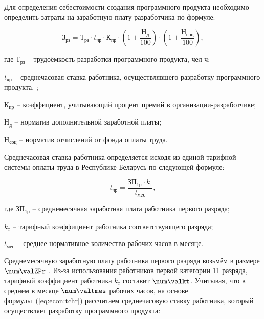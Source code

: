 Для определения себестоимости создания программного продукта необходимо определить затраты
на заработную плату разработчика по формуле:

\begin{equation}
  \label{eq:econ:Zrz}
  \text{З}_{\text{рз}} =
  \text{Т}_{\text{рз}} \cdot
  t_{\text{чр}} \cdot
  \text{К}_{\text{пр}} \cdot
  \left(\text{1} + \frac{\text{Н}_{\text{д}}}{\text{100}}\right) \cdot
  \left(\text{1} + \frac{\text{Н}_{\text{соц}}}{\text{100}}\right),
\end{equation}
\begin{explanationx}
  \item[где] $ \text{Т}_\text{рз} $ -- трудоёмкость разработки программного продукта, чел-ч;
  \item $ t_\text{чр} $ -- среднечасовая ставка работника, осуществлявшего разработку программного продукта, \rub;
  \item $ \text{К}_\text{пр} $ -- коэффициент, учитывающий процент премий
    в организации-раз\-ра\-бот\-чи\-ке;
  \item $ \text{Н}_\text{д} $ -- норматив дополнительной заработной платы;
  \item $ \text{Н}_\text{соц} $ -- норматив отчислений от фонда оплаты труда.
\end{explanationx}

Среднечасовая ставка работника определяется исходя из единой тарифной системы оплаты труда
в Республике Беларусь по следующей формуле:

\begin{equation}
  \label{eq:econ:tchr}
  t_\text{чр} = \frac{\text{ЗП}_\text{1р} \cdot k_\text{т}}{t_\text{мес}},
\end{equation}
\begin{explanationx}
  \item[где] $ \text{ЗП}_\text{1р} $ -- среднемесячная заработная плата работника первого разряда;
  \item $ k_\text{т} $ -- тарифный коэффициент работника соответствующего разряда;
  \item $ t_\text{мес} $ -- среднее нормативное количество рабочих часов в месяце.
\end{explanationx}

Среднемесячную заработную плату работника первого разряда возьмём в размере $ \num\valZPr $ \rub.
Из-за использования работников первой категории 11 разряда, тарифный коэффициент работника
$ k_\text{т} $ составит $ \num\valkt $. Учитывая, что в среднем в месяце $ \num\valtmes $
рабочих часов, на основе формулы~(\ref{eq:econ:tchr}) рассчитаем среднечасовую ставку работника,
который осуществляет разработку программного продукта:

